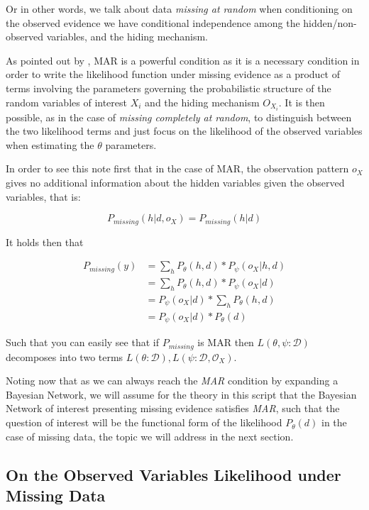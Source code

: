 \documentclass[11pt]{article}
\begin{document}
\begin{article}
Or in other words, we talk about data \emph{missing at random} when
conditioning on the observed evidence we have conditional
independence among the hidden/non-observed variables, and the
hiding mechanism.

As pointed out by \cite{koller2009probabilistic}, MAR is a powerful
condition as it is a necessary condition in order to write the
likelihood function under missing evidence as a product of terms
involving the parameters governing the probabilistic structure of
the random variables of interest \(X_i\) and the hiding mechanism
\(O_{X_i}\). It is then possible, as in the case of \emph{missing
completely at random}, to distinguish between the two likelihood
terms and just focus on the likelihood of the observed variables
when estimating the \(\theta\) parameters.

In order to see this note first that in the case of MAR, the
observation pattern \(o_X\) gives no additional information about the
hidden variables given the observed variables, that is:

$$ P_{missing} (h | d, o_{X}) =  P_{missing} (h | d) $$

It holds then that 


\begin{align}
P_{missing}(y) &= \sum_h P_{\theta} (h, d) * P_\psi(o_{X} | h, d) \nonumber \\
             &= \sum_h P_{\theta} (h, d) * P_\psi(o_{X} | d) \nonumber \\
             &= P_\psi(o_{X} | d) * \sum_h P_{\theta} (h, d)  \nonumber \\
	     &= P_\psi(o_{X} | d) * P_{\theta} (d)  \nonumber		
\end{align}

Such that you can easily see that if \(P_{missing}\) is MAR then
\(L(\theta, \psi : \mathcal{D})\) decomposes into two terms \(L(\theta :
   \mathcal{D}), L(\psi : \mathcal{D}, \mathcal{O}_X)\).

Noting now that as we can always reach the \emph{MAR} condition by
expanding a Bayesian Network, we will assume for the theory in this
script that the Bayesian Network of interest presenting missing
evidence satisfies \emph{MAR}, such that the question of interest will
be the functional form of the likelihood \(P_{\theta} (d)\) in the
case of missing data, the topic we will address in the next
section.

\subsection{On the Observed Variables Likelihood under Missing Data}
\label{sec:orgbf3aa25}


\end{article}
\end{document}
